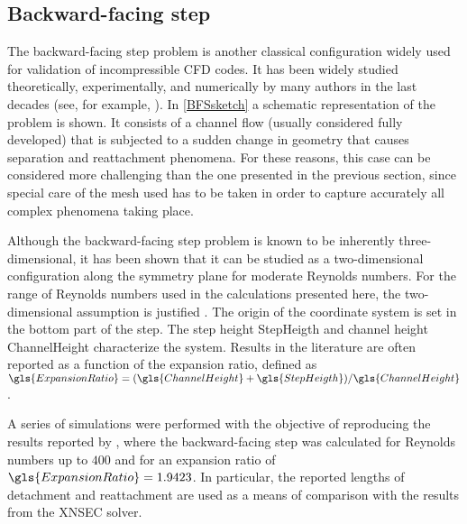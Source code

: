 
\subsection{Backward-facing step}\label{ssec:BackwardFacingStep}
The backward-facing step problem is another classical configuration widely used for validation of incompressible CFD codes. It has been widely studied theoretically, experimentally, and numerically by many authors in the last decades (see, for example, \textcite{armalyExperimentalTheoreticalInvestigation1983,barkleyThreedimensionalInstabilityFlow2000,biswasBackwardFacingStepFlows2004} ).  In \cref{BFSsketch} a schematic representation of the problem is shown. It consists of a channel flow (usually considered fully developed) that is subjected to a sudden change in geometry that causes separation and reattachment phenomena. For these reasons, this case can be considered more challenging than the one presented in the previous section, since special care of the mesh used has to be taken in order to capture accurately all complex phenomena taking place.

Although the backward-facing step problem is known to be inherently three-dimensional, it has been shown that it can be studied as a two-dimensional configuration along the symmetry plane for moderate Reynolds numbers. For the range of Reynolds numbers used in the calculations presented here, the two-dimensional assumption is justified \parencite{barkleyThreedimensionalInstabilityFlow2000, biswasBackwardFacingStepFlows2004}.  The origin of the coordinate system is set in the bottom part of the step. The step height \gls{StepHeigth} and channel height \gls{ChannelHeight} characterize the system. Results in the literature are often reported as a function of the expansion ratio, defined as $\gls{ExpansionRatio} = (\gls{ChannelHeight}+\gls{StepHeigth})/\gls{ChannelHeight}$.

A series of simulations were performed with the objective of reproducing the results reported by \textcite{biswasBackwardFacingStepFlows2004}, where the backward-facing step was calculated for Reynolds numbers up to $400$ and for an expansion ratio of $\gls{ExpansionRatio} = 1.9423$. In particular, the reported lengths of detachment and reattachment are used as a means of comparison with the results from the XNSEC solver.

